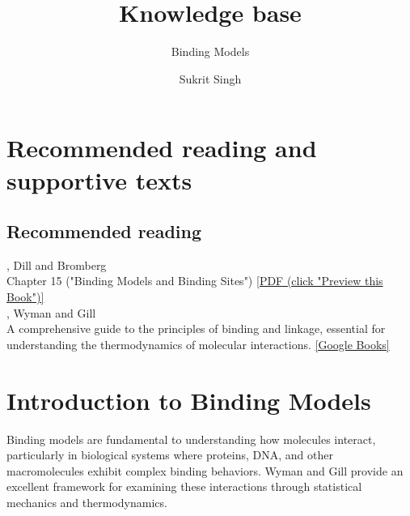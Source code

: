 \documentclass[english,course]{lecture}
\title{Knowledge base}
\subtitle{Binding Models}
\author{Sukrit Singh}
\begin{document}
\vfill
\eject


\section{Recommended reading and supportive texts}

\subsection*{Recommended reading}

, Dill and Bromberg\\
Chapter 15 ("Binding Models and Binding Sites") \href{https://tinyurl.com/dill-bromberg-preview}{[PDF (click "Preview this Book")]}\\

, Wyman and Gill \\
A comprehensive guide to the principles of binding and linkage, essential for understanding the thermodynamics of molecular interactions.
\href{https://books.google.com/books/about/Binding_and_Linkage.html?id=daxAKlHw7qQC}{[Google Books]}

\vfill
\eject


\section{Introduction to Binding Models}

Binding models are fundamental to understanding how molecules interact, particularly in biological systems where proteins, DNA, and other macromolecules exhibit complex binding behaviors. Wyman and Gill provide an excellent framework for examining these interactions through statistical mechanics and thermodynamics.
\end{document}
